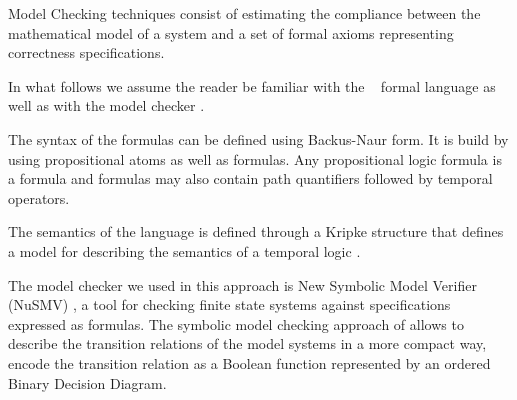 
Model Checking techniques consist of estimating the compliance between the mathematical model of a system and a set of formal axioms representing correctness specifications. 

In what follows we assume the reader be familiar with the \ctl\ \cite{clar-grum-pele-99} formal language as well as with the \smv model checker \cite{smv92}.

The syntax of the formulas can be defined using Backus-Naur form. It is build by using propositional atoms as well as \ctl formulas. Any propositional logic formula is a \ctl formula and \ctl formulas may also contain path quantifiers followed by temporal operators. 

The semantics of the language is defined through a Kripke structure that defines a model for describing the semantics of a
temporal logic \cite{huth-ryan-99}.


The model checker we used in this approach is New Symbolic Model Verifier (NuSMV) \cite{smv92}, a tool for checking finite state systems against specifications expressed as \ctl formulas. The symbolic model checking approach of \smv allows to describe the transition relations of the model systems in a more compact way, \ie encode the transition relation as a Boolean function represented by an ordered Binary Decision Diagram.